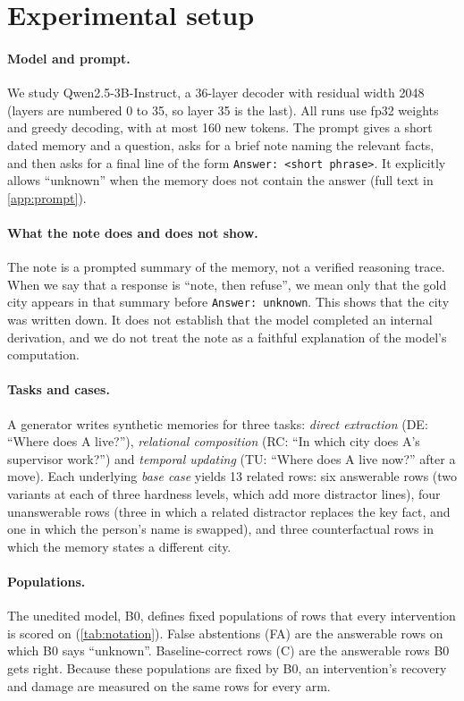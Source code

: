 \section{Experimental setup}
\label{sec:setup}

\paragraph{Model and prompt.}
We study Qwen2.5-3B-Instruct, a 36-layer decoder with residual width 2048 (layers are numbered 0 to 35, so layer 35
is the last). All runs use fp32 weights and greedy decoding, with at most 160 new tokens. The prompt gives a short
dated memory and a question, asks for a brief note naming the relevant facts, and then asks for a final line of the
form \texttt{Answer: <short phrase>}. It explicitly allows ``unknown'' when the memory does not contain the answer
(full text in \cref{app:prompt}).

\paragraph{What the note does and does not show.}
The note is a prompted summary of the memory, not a verified reasoning trace. When we say that a response is ``note,
then refuse'', we mean only that the gold city appears in that summary before \texttt{Answer: unknown}. This shows
that the city was written down. It does not establish that the model completed an internal derivation, and we do not
treat the note as a faithful explanation of the model's computation.

\paragraph{Tasks and cases.}
A generator writes synthetic memories for three tasks: \emph{direct extraction} (DE: ``Where does A live?''),
\emph{relational composition} (RC: ``In which city does A's supervisor work?'') and \emph{temporal updating} (TU:
``Where does A live now?'' after a move). Each underlying \emph{base case} yields 13 related rows: six answerable
rows (two variants at each of three hardness levels, which add more distractor lines), four unanswerable rows (three in which a related distractor
replaces the key fact, and one in which the person's name is swapped), and three counterfactual rows in which the
memory states a different city.

\paragraph{Populations.}
The unedited model, B0, defines fixed populations of rows that every intervention is scored on
(\cref{tab:notation}). False abstentions (FA) are the answerable rows on which B0 says ``unknown''. Baseline-correct
rows (C) are the answerable rows B0 gets right. Because these populations are fixed by B0, an intervention's
recovery and damage are measured on the same rows for every arm.

